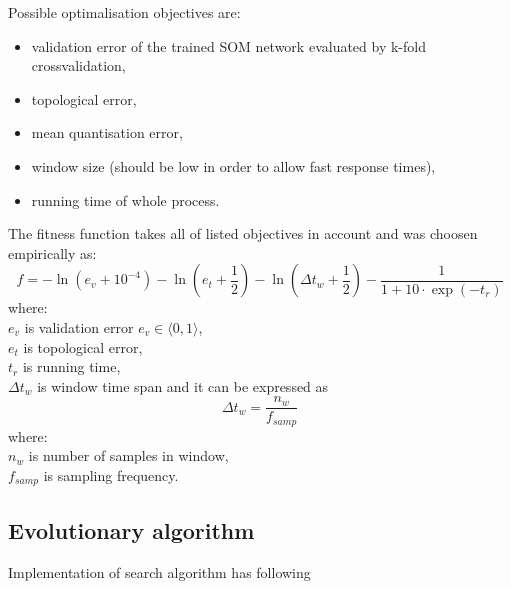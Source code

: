 \documentclass[a4paper,journal]{IEEEtran}
\begin{document}
Possible optimalisation objectives are:
\begin{itemize}
	\item validation error of the trained SOM network evaluated by k-fold
	crossvalidation,
	\item topological error,
	\item mean quantisation error,
	\item window size (should be low in order to allow fast response times),
	\item running time of whole process.
\end{itemize}

The fitness function takes all of listed objectives in account and 
was choosen empirically as:
\[ f = -\ln(e_{v}+10^{-4}) - \ln(e_t + \frac{1}{2}) -
\ln(\Delta t_w + \frac{1}{2}) - \frac{1}{1+10\cdot \exp(-t_r)} \]
where:\\
$ e_v $ is validation error $ e_v \in \langle 0, 1 \rangle $,\\
$ e_t $ is topological error,\\
$ t_r $ is running time,\\
$ \Delta t_w $ is window time span and it can be expressed as 
\[  \Delta t_w = \frac{n_w}{f_{samp}}  \]
where:\\
$ n_w $ is number of samples in window,\\
$ f_{samp} $ is sampling frequency.

\subsection{Evolutionary algorithm}
Implementation of search algorithm has following 


%
\end{document}
